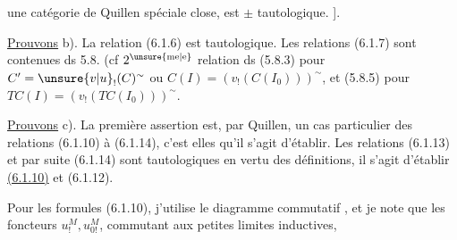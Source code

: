 
 une catégorie de Quillen spéciale close, est
$\pm$ tautologique. ].

\uline{Prouvons} b). La relation (6.1.6) est
tautologique. Les relations (6.1.7) sont
contenues ds 5.8. (cf $2^{\unsure{\mathrm{me}|\mathrm{e}}}$ relation
ds (5.8.3) pour $C'=\unsure{v|u}_{!}(C)^{\sim}$ ou
$C(I)=(v_{!}(C(I_{0})))^{\sim}$, et (5.8.5) pour
$TC(I)=(v_{!}(TC(I_{0})))^{\sim}$.

\uline{Prouvons} c). La première assertion
est, par Quillen, un cas particulier
des relations (6.1.10) à (6.1.14), c'est
elles qu'il s'agit d'établir. Les relations
(6.1.13) et par suite (6.1.14) sont
tautologiques en vertu des définitions,
 il s'agit d'établir \uline{(6.1.10)}
et (6.1.12).

Pour les formules (6.1.10), j'utilise
le diagramme commutatif
,
et je note que les foncteurs $u_{!}^{M},u_{0!}^{M}$, commutant aux petites limites inductives,  

